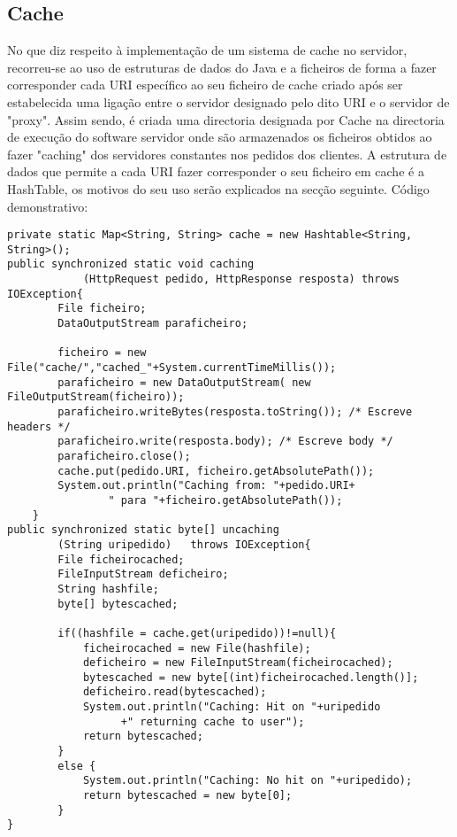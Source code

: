 \documentclass{llncs}
\begin{document}
\subsection{Cache}
No que diz respeito à implementação de um sistema de cache no servidor, recorreu-se 
ao uso de estruturas de dados do Java e a ficheiros de forma a fazer 
corresponder cada URI específico ao seu ficheiro de cache criado após ser 
estabelecida uma ligação entre o servidor designado pelo dito URI e o servidor 
de "proxy". Assim sendo, é criada uma directoria designada por Cache na 
directoria de execução do software servidor onde são armazenados os ficheiros 
obtidos ao fazer "caching" dos servidores constantes nos pedidos dos clientes.
A estrutura de dados que permite a cada URI fazer corresponder o seu ficheiro em 
cache é a HashTable, os motivos do seu uso serão explicados na secção seguinte.
Código demonstrativo:
\begin{verbatim}
private static Map<String, String> cache = new Hashtable<String, String>();
public synchronized static void caching
            (HttpRequest pedido, HttpResponse resposta) throws IOException{
    	File ficheiro;
    	DataOutputStream paraficheiro;
    	
    	ficheiro = new File("cache/","cached_"+System.currentTimeMillis());
    	paraficheiro = new DataOutputStream( new FileOutputStream(ficheiro));
    	paraficheiro.writeBytes(resposta.toString()); /* Escreve headers */
    	paraficheiro.write(resposta.body); /* Escreve body */
    	paraficheiro.close();
    	cache.put(pedido.URI, ficheiro.getAbsolutePath());
    	System.out.println("Caching from: "+pedido.URI+
    	        " para "+ficheiro.getAbsolutePath());
    }
public synchronized static byte[] uncaching
        (String uripedido)   throws IOException{
  		File ficheirocached;
  		FileInputStream deficheiro;
  		String hashfile;
  		byte[] bytescached;

  		if((hashfile = cache.get(uripedido))!=null){
  			ficheirocached = new File(hashfile);
  			deficheiro = new FileInputStream(ficheirocached);
  			bytescached = new byte[(int)ficheirocached.length()];
  			deficheiro.read(bytescached);
  			System.out.println("Caching: Hit on "+uripedido
  			      +" returning cache to user");
  			return bytescached;
  		}
  		else {
  			System.out.println("Caching: No hit on "+uripedido);
  			return bytescached = new byte[0];
  		}
}
\end{verbatim}
\end{document}
